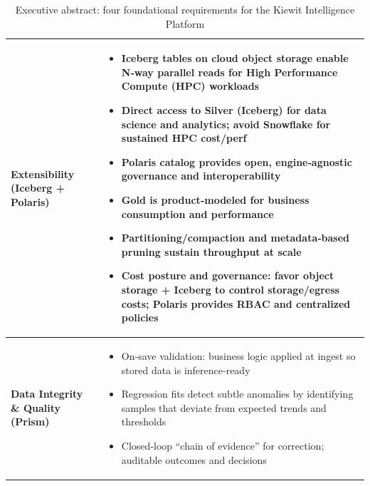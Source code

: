 \documentclass[12pt, a4paper]{article}
\begin{document}
\begin{table}[h!]
\begin{tabularx}{\textwidth}{@{}
  >{\raggedright\arraybackslash\relax}p{2.8cm}
  X@{}}
\textbf{Extensibility (Iceberg + Polaris)} &
\begin{itemize}[leftmargin=*, nosep]
  \item Iceberg tables on cloud object storage enable N‑way parallel reads for High Performance Compute (HPC) workloads
  \item Direct access to Silver (Iceberg) for data science and analytics; avoid Snowflake for sustained HPC cost/perf
  \item Polaris catalog provides open, engine‑agnostic governance and interoperability
  \item Gold is product‑modeled for business consumption and performance
  \item Partitioning/compaction and metadata‑based pruning sustain throughput at scale
  \item Cost posture and governance: favor object storage + Iceberg to control storage/egress costs; Polaris provides RBAC and centralized policies
\end{itemize} \\
\midrule

\textbf{Data Integrity \& Quality (Prism)} &
\begin{itemize}[leftmargin=*, nosep]
  \item On‑save validation: business logic applied at ingest so stored data is inference‑ready
  \item Regression fits detect subtle anomalies by identifying samples that deviate from expected trends and thresholds
  \item Closed‑loop “chain of evidence” for correction; auditable outcomes and decisions
\end{itemize} \\
\bottomrule
\end{tabularx}
\caption{Executive abstract: four foundational requirements for the Kiewit Intelligence Platform}
\label{tab:dsx_exec_overview}
\end{table}

\thispagestyle{empty}
\newpage
\end{document}
